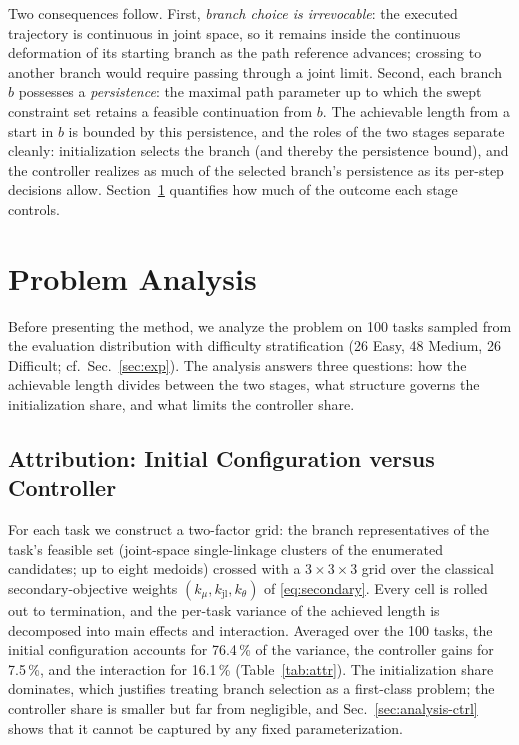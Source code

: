 \documentclass[journal]{IEEEtran}
\newcommand{\phVarSeed}{76.4}        %
\newcommand{\phVarGain}{7.5}        %
\newcommand{\phVarInter}{16.1}        %
\begin{document}
Two consequences follow. First, \textit{branch choice is irrevocable}:
the executed trajectory is continuous in joint space, so it remains
inside the continuous deformation of its starting branch as the path
reference advances; crossing to another branch would require passing
through a joint limit. Second, each branch $b$ possesses a
\textit{persistence}: the maximal path parameter up to which the swept
constraint set retains a feasible continuation from $b$. The achievable
length from a start in $b$ is bounded by this persistence, and the
roles of the two stages separate cleanly: initialization selects the
branch (and thereby the persistence bound), and the controller realizes
as much of the selected branch's persistence as its per-step decisions
allow. Section~\ref{sec:analysis} quantifies how much of the outcome
each stage controls.

\section{Problem Analysis}
\label{sec:analysis}
Before presenting the method, we analyze the problem on 100 tasks
sampled from the evaluation distribution with difficulty
stratification (26 Easy, 48 Medium, 26 Difficult;
cf.~Sec.~\ref{sec:exp}). The analysis answers three questions: how the
achievable length divides between the two stages, what structure
governs the initialization share, and what limits the controller
share.

\subsection{Attribution: Initial Configuration versus Controller}
\label{sec:analysis-attr}
For each task we construct a two-factor grid: the branch
representatives of the task's feasible set (joint-space single-linkage
clusters of the enumerated candidates; up to eight medoids) crossed
with a $3{\times}3{\times}3$ grid over the classical secondary-objective
weights $(k_{\mu},k_{\mathrm{jl}},k_{\theta})$ of \eqref{eq:secondary}.
Every cell is rolled out to termination, and the per-task variance of
the achieved length is decomposed into main effects and interaction.
Averaged over the 100 tasks, the initial configuration accounts for
\phVarSeed\,\% of the variance, the controller gains for
\phVarGain\,\%, and the interaction for \phVarInter\,\%
(Table~\ref{tab:attr}). The initialization share dominates, which
justifies treating branch selection as a first-class problem; the
controller share is smaller but far from negligible, and
Sec.~\ref{sec:analysis-ctrl} shows that it cannot be captured by any
fixed parameterization.
\end{document}
